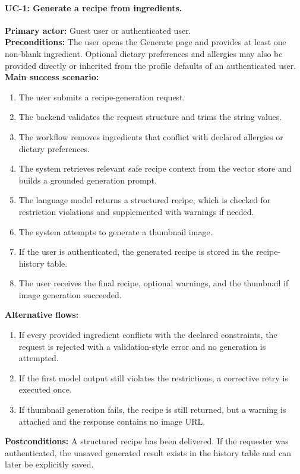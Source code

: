 \paragraph{UC-1: Generate a recipe from ingredients.}
\textbf{Primary actor:} Guest user or authenticated user. \\
\textbf{Preconditions:} The user opens the Generate page and provides at
least one non-blank ingredient. Optional dietary preferences and
allergies may also be provided directly or inherited from the profile
defaults of an authenticated user. \\
\textbf{Main success scenario:}
\begin{enumerate}
	\item The user submits a recipe-generation request.
	\item The backend validates the request structure and trims the string
	values.
	\item The workflow removes ingredients that conflict with declared
	allergies or dietary preferences.
	\item The system retrieves relevant safe recipe context from the vector
	store and builds a grounded generation prompt.
	\item The language model returns a structured recipe, which is checked
	for restriction violations and supplemented with warnings if needed.
	\item The system attempts to generate a thumbnail image.
	\item If the user is authenticated, the generated recipe is stored in
	the recipe-history table.
	\item The user receives the final recipe, optional warnings, and the
	thumbnail if image generation succeeded.
\end{enumerate}
\textbf{Alternative flows:}
\begin{enumerate}
	\item If every provided ingredient conflicts with the declared
	constraints, the request is rejected with a validation-style error and
	no generation is attempted.
	\item If the first model output still violates the restrictions, a
	corrective retry is executed once.
	\item If thumbnail generation fails, the recipe is still returned, but
	a warning is attached and the response contains no image URL.
\end{enumerate}
\textbf{Postconditions:} A structured recipe has been delivered. If the
requester was authenticated, the unsaved generated result exists in the
history table and can later be explicitly saved.

